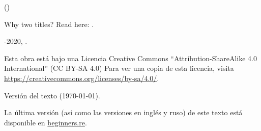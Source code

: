 ﻿\begin{titlepage}


\end{titlepage}

\newpage

\begin{center}
\vspace*{\fill}
{\LARGE \TitleMain}

\bigskip

{\large (\TitleAux)}

\bigskip
\bigskip
Why two titles? Read here: . %

\vspace*{\fill}

{\large \AUTHOR}

{\large \TT{<\EMAIL>}}
\vspace*{\fill}
\vfill

\ccbysa

-2020, \AUTHOR. 

Esta obra est\'a bajo una Licencia Creative Commons ``Attribution-ShareAlike 4.0 International'' (CC BY-SA 4.0)
Para ver una copia de esta licencia, visita \url{https://creativecommons.org/licenses/by-sa/4.0/}.

Versi\'on del texto ({\large \today}).

La \'ultima versi\'on (as\'i como las versiones en ingl\'es y ruso) de este texto est\'a disponible en
\href{http://go.yurichev.com/17009}{beginners.re}.

\end{center}
